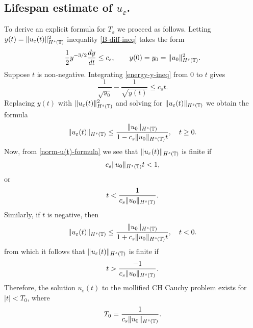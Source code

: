\subsection{Lifespan estimate of $u_\ee$.} To derive an explicit formula for
$T_\ee$ we proceed as follows.  Letting  $y(t)=
\|u_\varepsilon(t)\|_{H^s(\mathbb{T})}^2$ inequality  \eqref{B-diff-ineq} takes the
form
%
\begin{equation} 
\label{energy-y-ineq}
\frac 12
y^{-3/2}\frac{dy}{dt}
\le
c_s,
\qquad
y(0)=y_0=  \|u_0\|_{H^s(\mathbb{T})}^2.
\end{equation}
%
Suppose $t$ is non-negative. Integrating  \eqref{energy-y-ineq} from  0  to $t$ gives
%
\begin{equation} 
\label{energy-y-ineq-calc1}
\frac{1}{\sqrt{y_0}}  - \frac{1}{\sqrt{y(t)}} 
\le
c_s t.
\end{equation}
%
%
Replacing $y(t)$ with   $\|u_\varepsilon(t)\|_{H^s(\mathbb{T})}^2$  and solving for  $\|u_\varepsilon(t)\|_{H^s(\mathbb{T})}$
we obtain the formula
%
\begin{equation} 
\label{norm-u(t)-formula}
\|u_\varepsilon(t)\|_{H^s(\mathbb{T})}
\le
\frac{\|u_0\|_{H^s(\mathbb{T})}}{1-c_s\|u_0\|_{H^s(\mathbb{T})} t}, \quad t\ge
0.
\end{equation}
%
Now, from \eqref{norm-u(t)-formula} we see that  $\|u_\varepsilon(t)\|_{H^s(\mathbb{T})}$ is finite  if 
%
\begin{equation*} 
\label{Lifespan-calc1}
c_s    \|u_0\|_{H^s(\mathbb{T})} t<1,
\end{equation*}
%
or
%
\begin{equation} 
t
<
\frac{1}{c_s \|u_0\|_{H^s(\mathbb{T})}}.
\end{equation}
%
Similarly, if $t$ is negative, then 
\begin{equation} 
\label{norm-u(t)-formula-prime}
\|u_\varepsilon(t)\|_{H^s(\mathbb{T})}
\le
\frac{\|u_0\|_{H^s(\mathbb{T})}}{1+c_s\|u_0\|_{H^s(\mathbb{T})} t}, \quad t < 0.
\end{equation}
from which it follows that $\|u_\varepsilon(t)\|_{H^s(\mathbb{T})}$ is finite  if 
%
\begin{equation} 
t
>
\frac{-1}{c_s \|u_0\|_{H^s(\mathbb{T})}}.
\end{equation}
Therefore, the  solution  $u_\ee(t)$ to the mollified CH Cauchy
problem exists for $|t| <T_0$, where
%
\begin{equation} 
\label{CH-Lifespan}
T_0
=
\frac{1}{c_s \|u_0\|_{H^s(\mathbb{T})}}.
\end{equation}
%
%  
% 
%
%
%   
%
\noindent

